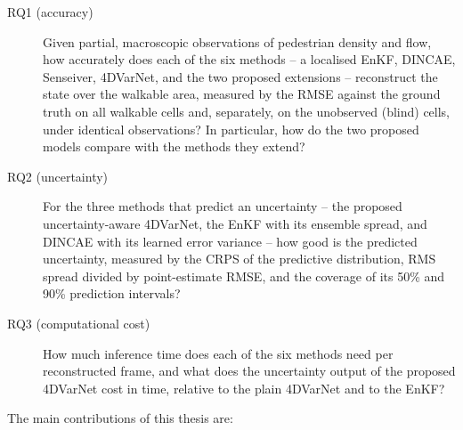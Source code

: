 \documentclass[english, 12pt, a4paper, elec, utf8, a-2b, online]{aaltothesis}
\begin{document}
\begin{description}
    \item[RQ1 (accuracy)] Given partial, macroscopic observations of
    pedestrian density and flow, how accurately does each of the six
    methods -- a localised EnKF, DINCAE, Senseiver, 4DVarNet, and the
    two proposed extensions -- reconstruct the state over the
    walkable area, measured by the RMSE against the ground truth on all
    walkable cells and, separately, on the unobserved (blind) cells, under
    identical observations? In particular, how do the two proposed
    models compare with the methods they extend?
    \item[RQ2 (uncertainty)] For the three methods that predict an
    uncertainty -- the proposed uncertainty-aware 4DVarNet, the EnKF
    with its ensemble spread, and DINCAE with its learned error
    variance -- how good is the predicted uncertainty, measured by the
    CRPS of the predictive distribution, RMS spread divided by
    point-estimate RMSE, and the coverage of its 50\% and 90\% prediction
    intervals?
    \item[RQ3 (computational cost)] How much inference time does each
    of the six methods need per reconstructed frame, and what does the
    uncertainty output of the proposed 4DVarNet cost in time, relative to
    the plain 4DVarNet and to the EnKF?
\end{description}


The main contributions of this thesis are:
\end{document}
